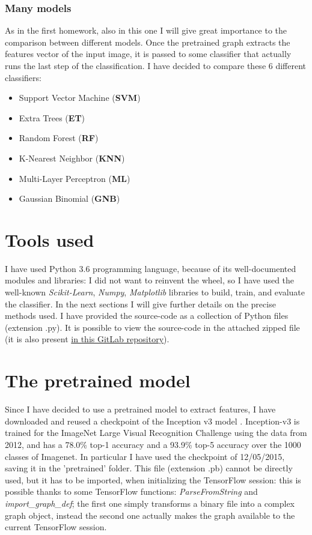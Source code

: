 \documentclass[12pt]{article}
\begin{document}
\subsubsection{Many models}
\label{sec:models}
As in the first homework, also in this one I will give great importance to the comparison between different models. Once the pretrained graph extracts the features vector of the input image, it is passed to some classifier that actually runs the last step of the classification. I have decided to compare these 6 different classifiers:
\begin{itemize}
	\item Support Vector Machine (\textbf{SVM})
	\item Extra Trees (\textbf{ET})
	\item Random Forest (\textbf{RF})
	\item K-Nearest Neighbor (\textbf{KNN})
	\item Multi-Layer Perceptron (\textbf{ML})
	\item Gaussian Binomial (\textbf{GNB})
\end{itemize}

\section{Tools used}
I have used Python 3.6 programming language, because of its well-documented modules and libraries: I did not want to reinvent the wheel, so I have used the well-known \textit{Scikit-Learn}, \textit{Numpy}, \textit{Matplotlib} libraries to build, train, and evaluate the classifier. In the next sections I will give further details on the precise methods used.
I have provided the source-code as a collection of Python files (extension .py). It is possible to view the source-code in the attached zipped file (it is also present \href{https://www.gitlab.com/lrusso96/machine-learning}{in this GitLab repository}).

\section{The pretrained model}
Since I have decided to use a pretrained model to extract features, I have downloaded and reused a checkpoint of the Inception v3 model \cite{Inception}. Inception-v3 is trained for the ImageNet Large Visual Recognition Challenge using the data from 2012, and has a 78.0\% top-1 accuracy and a 93.9\% top-5 accuracy over the 1000 classes of Imagenet. In particular I have used the checkpoint of 12/05/2015, saving it in the 'pretrained' folder. This file (extension .pb) cannot be directly used, but it has to be imported, when initializing the TensorFlow session: this is possible thanks to some TensorFlow functions: \textit{ParseFromString} and \textit{import\_graph\_def}; the first one simply transforms a binary file into a complex graph object, instead the second one actually makes the graph available to the current TensorFlow session.
\end{document}
